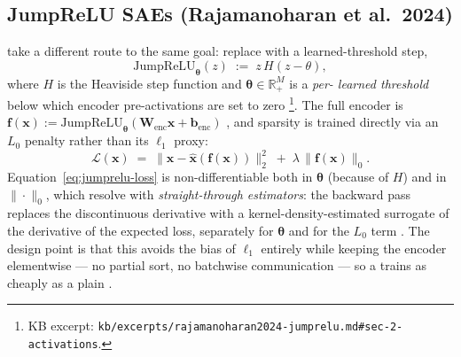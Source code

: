 \subsection{JumpReLU SAEs (Rajamanoharan et al.\ 2024)}
\label{sec:sae-jumprelu}

\citet{rajamanoharan2024-jumprelu} take a different route to the same
goal: replace  with a learned-threshold step,
\begin{equation}
  \mathrm{JumpReLU}_{\boldsymbol{\theta}}(z) \;:=\; z\,H(z - \theta),
  \label{eq:jumprelu}
\end{equation}
where $H$ is the Heaviside step function and
$\boldsymbol{\theta} \in \mathbb{R}^M_+$ is a \emph{per- learned
threshold} below which encoder pre-activations are set to zero
\citep[\S 2, Eq.~4]{rajamanoharan2024-jumprelu}\footnote{KB excerpt:
\texttt{kb/excerpts/rajamanoharan2024-jumprelu.md\#sec-2-activations}.}.
The full  encoder is
$\mathbf{f}(\mathbf{x}) := \mathrm{JumpReLU}_{\boldsymbol{\theta}}(\mathbf{W}_{\text{enc}}\mathbf{x} + \mathbf{b}_{\text{enc}})$
\citep[\S 3, Eq.~8]{rajamanoharan2024-jumprelu}, and sparsity is
trained directly via an $L_0$ penalty rather than its $\ell_1$ proxy:
\begin{equation}
  \mathcal{L}(\mathbf{x})
  \;=\;
  \|\mathbf{x} - \hat{\mathbf{x}}(\mathbf{f}(\mathbf{x}))\|_2^2
  \;+\;
  \lambda\,\|\mathbf{f}(\mathbf{x})\|_0.
  \label{eq:jumprelu-loss}
\end{equation}
Equation~\eqref{eq:jumprelu-loss} is non-differentiable both in
$\boldsymbol{\theta}$ (because of $H$) and in $\|\cdot\|_0$, which
\citet{rajamanoharan2024-jumprelu} resolve with
\emph{straight-through estimators}: the backward pass replaces the
discontinuous derivative with a kernel-density-estimated surrogate of
the derivative of the expected loss, separately for $\boldsymbol{\theta}$
and for the $L_0$ term \citep[\S 3]{rajamanoharan2024-jumprelu}. The
 design point is that this avoids the  bias of $\ell_1$
entirely while keeping the encoder elementwise --- no partial sort, no
batchwise communication --- so a  trains as cheaply as a
plain  .

